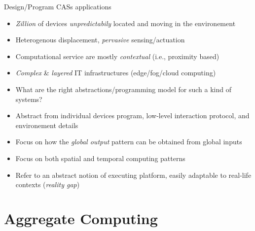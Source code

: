 \documentclass[8pt, aspectratio=169, handout]{beamer}
\begin{document}
\begin{frame}{Design/Program CASs applications}
  \begin{alarm}
    \begin{itemize}
      \item \emph{Zillion} of devices \emph{unpredictabily} located and moving in the environement
      \item Heterogenous displacement, \emph{pervasive} sensing/actuation
      \item Computational service are mostly \emph{contextual} (i.e., proximity based)
      \item \emph{Complex} \& \emph{layered} IT infrastructures (edge/fog/cloud computing)
      \item[\faArrowRight] What are the right abstractions/programming model for such a kind of systems?
    \end{itemize}
  \end{alarm}
  \begin{card}
    \begin{itemize}
      \item[\faThumbsUp] Abstract from individual devices program, low-level interaction protocol, and environement details
      \item[\faThumbsUp] Focus on how the \emph{global output} pattern can be obtained from global
      inputs
      \item[\faThumbsUp] Focus on both spatial and temporal computing patterns
      \item[\faThumbsUp] Refer to an abstract notion of executing platform, easily adaptable to
      real-life contexts (\emph{reality gap}) 
    \end{itemize}
  \end{card}
\end{frame}
\section{Aggregate Computing}
\end{document}
